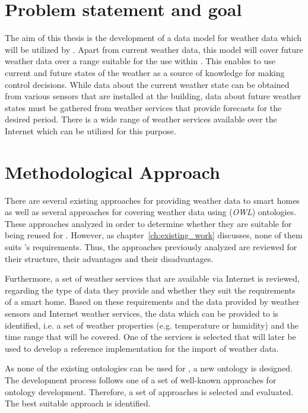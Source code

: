 \section{Problem statement and goal}

The aim of this thesis is the development of a data model for weather data which will be utilized by \thinkhome. Apart from current weather data, this model will cover future weather data over a range suitable for the use within \thinkhome. This enables \thinkhome to use current and future states of the weather as a source of knowledge for making control decisions. While data about the current weather state can be obtained from various sensors that are installed at the building, data about future weather states must be gathered from weather services that provide forecasts for the desired period. There is a wide range of weather services available over the Internet which can be utilized for this purpose.


\section{Methodological Approach}


There are several existing approaches for providing weather data to smart homes as well as several approaches for covering weather data using (\emph{OWL}) ontologies. These approaches analyzed in order to determine whether they are suitable for being reused for \thinkhome. However, as chapter~\ref{ch:existing_work} discusses, none of them suits \thinkhome's requirements. Thus, the approaches previously analyzed are reviewed for their structure, their advantages and their disadvantages.

Furthermore, a set of weather services that are available via Internet is reviewed, regarding the type of data they provide and whether they suit the requirements of a smart home. Based on these requirements and the data provided by weather sensors and Internet weather services, the data which can be provided to \thinkhome is identified, i.e. a set of weather properties (e.g. temperature or humidity) and the time range that will be covered. One of the services is selected that will later be used to develop a reference implementation for the import of weather data.

As none of the existing ontologies can be used for \thinkhome, a new ontology is designed. The development process follows one of a set of well-known approaches for ontology development. Therefore, a set of approaches is selected and evaluated. The best suitable approach is identified.

